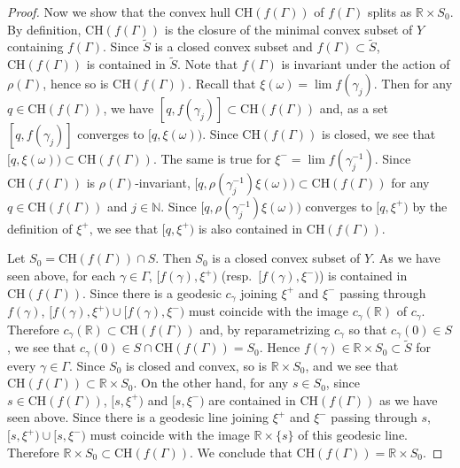 \documentclass[12pt]{amsart}
\numberwithin{equation}{section}
\theoremstyle{plain}
\theoremstyle{definition}
\theoremstyle{remark}
\newcommand{\R}{{\mathbb R}}
\newcommand{\N}{{\mathbb N}}
\newcommand{\ch}[1]{\mathrm{CH}(#1)}
\begin{document}
\begin{proof}
Now we show that the convex hull $\ch{f(\Gamma)}$ of $f(\Gamma)$
splits as $\R \times S_0$. 
By definition, $\ch{f(\Gamma)}$ is the closure of the minimal convex
subset of $Y$ containing $f(\Gamma)$.  
Since $\tilde S$ is a closed convex subset and 
$f(\Gamma) \subset \tilde S$, $\ch{f(\Gamma)}$ is contained in 
$\tilde S$.
Note that $f(\Gamma)$ is invariant under the action of $\rho(\Gamma)$,
hence so is $\ch{f(\Gamma)}$. 
Recall that $\xi(\omega)=\lim f(\gamma_j)$. 
Then for any $q \in \ch{f(\Gamma)}$, we have
$[q,f(\gamma_j)]\subset \ch{f(\Gamma)}$ and, as a set
$[q,f(\gamma_j)]$ converges to $[q,\xi(\omega))$.  Since
$\ch{f(\Gamma)}$ is closed, we see that 
$[q,\xi(\omega)) \subset \ch{f(\Gamma)}$.  The same is true for
$\xi^- =\lim f(\gamma_j^{-1})$.  Since $\ch{f(\Gamma)}$ is
$\rho(\Gamma)$-invariant, 
$[q, \rho(\gamma_j^{-1})\xi(\omega)) \subset \ch{f(\Gamma)}$ for
any $q \in \ch{f(\Gamma)}$ and $j \in \N$. Since
$[q, \rho(\gamma_j^{-1})\xi(\omega))$ converges to $[q, \xi^+)$ by the 
definition of $\xi^+$, we see that $[q, \xi^+)$ is also contained in
$\ch{f(\Gamma)}$. 

Let $S_0 = \ch{f(\Gamma)} \cap S$.  Then $S_0$ is a closed convex
subset of $Y$. 
As we have seen above, for each $\gamma \in \Gamma$, 
$[f(\gamma),\xi^+)$ (resp.~$[f(\gamma),\xi^-)$) is contained in
$\ch{f(\Gamma)}$.
Since there is a geodesic $c_{\gamma}$ joining $\xi^+$ and $\xi^-$ passing
through $f(\gamma)$, $[f(\gamma),\xi^+)\cup [f(\gamma),\xi^-)$ must
coincide with the image $c_{\gamma}(\R)$ of $c_{\gamma}$. 
Therefore $c_{\gamma}(\R) \subset \ch{f(\Gamma)}$ and, 
by reparametrizing $c_{\gamma}$ so that $c_{\gamma}(0) \in S$, we see
that $c_{\gamma}(0) \in S \cap \ch{f(\Gamma)}=S_0$. 
Hence $f(\gamma) \in \R \times S_0 \subset \tilde S$ for every
$\gamma \in \Gamma$.
Since $S_0$ is closed and convex, so is $\R \times S_0$, and we see that 
$\ch{f(\Gamma)} \subset \R \times S_0$. 
On the other hand, for any $s \in S_0$, since 
$s \in \ch{f(\Gamma)}$, 
$[s,\xi^+)$ and $[s,\xi^-)$ are contained in $\ch{f(\Gamma)}$ as we
have seen above. 
Since there is a geodesic line joining $\xi^+$ and $\xi^-$ passing through
$s$, $[s,\xi^+) \cup [s,\xi^-)$ must coincide with the image
$\R \times \{s\}$ of this geodesic line. 
Therefore $\R \times S_0 \subset \ch{f(\Gamma)}$. 
We conclude that $\ch{f(\Gamma)}=\R \times S_0$.


\end{proof}
\end{document}
